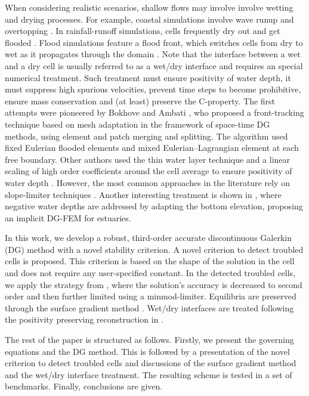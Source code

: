 When considering realistic scenarios, shallow flows may involve involve wetting and drying processes.  For example, coastal simulations involve wave runup and
overtopping \cite{Vater20151, Medeiros2013, Vater2019}. In rainfall-runoff simulations, cells frequently dry out and get flooded \cite{Simons2014, Lacasta2014, Xia2017}. Flood simulations feature a flood front, which switches cells from dry to wet as it propagates through the domain \cite{George2011}.  Note that the interface between a wet and a dry cell is usually referred to as a wet/dry interface \cite{Bollermann2013, Beisiegel2015} and requires an special numerical treatment. Such treatment must ensure positivity of water depth, it must suppress high spurious velocities, prevent time steps to become prohibitive, ensure mass conservation and (at least) preserve the C-property. The first attempts were pioneered by Bokhove \cite{ref1} and Ambati \cite{Ambati2007452}, who proposed a front-tracking technique based on mesh adaptation in the framework of space-time DG methods, using element and patch merging and splitting. The algorithm used fixed Eulerian flooded elements and mixed Eulerian–Lagrangian element at each free boundary. Other authors used the thin water layer technique \cite{ern2008, cotoJe,Lee:2016} and a  linear scaling of high order coefficients around the cell average to ensure positivity of water depth \cite{xing2010,Marras:2016}. However, the most common approaches in the literature rely on slope-limiter techniques \cite{Beisiegel2015, Vater20151, Vater2019,Le:2020}. Another interesting treatment is shown in \cite{Karna:2011}, where negative water depths are addressed by adapting the bottom elevation, proposing an implicit DG-FEM for estuaries.



In this work, we develop a robust, third-order accurate discontinuous
Galerkin (DG) method with a novel stability criterion. A novel criterion to detect troubled cells is proposed.
This criterion is based on the shape of the solution in the cell and
does not require any user-specified constant.  In the detected
troubled cells, we apply the strategy from \cite{Cockburn1989b}, where
the solution's accuracy is decreased to second order and then further
limited using a minmod-limiter.  Equilibria are preserved through the
surface gradient method \cite{zhou}.  Wet/dry interfaces are treated
following the positivity preserving reconstruction in \cite{kurg2}.

The rest of the paper is structured as follows.  Firstly, we present
the governing equations and the DG method.  This is followed by a
presentation of the novel criterion to detect troubled cells and
discussions of the surface gradient method and the wet/dry interface
treatment.  The resulting scheme is tested in a set of benchmarks.
Finally, conclusions are given.
